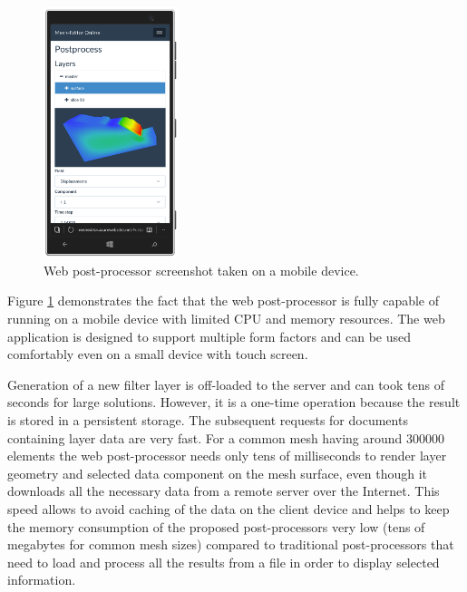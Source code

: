 \begin{figure}[H]
    \centering
    \includegraphics[width=0.35\textwidth]{figures/chapter-data-management/web-postprocessor-mobile}
    \decoRule
    \caption{Web post-processor screenshot taken on a mobile device.}
    \label{fig:web-postprocessor-mobile}
\end{figure}

Figure \ref{fig:web-postprocessor-mobile} demonstrates the fact that the web post-processor is fully capable of running on a mobile device with limited CPU and memory resources. The web application is designed to support multiple form factors and can be used comfortably even on a small device with touch screen.

Generation of a new filter layer is off-loaded to the server and can took tens of seconds for large solutions. However, it is a one-time operation because the result is stored in a persistent storage. The subsequent requests for documents containing layer data are very fast. For a common mesh having around 300000 elements the web post-processor needs only tens of milliseconds to render layer geometry and selected data component on the mesh surface, even though it downloads all the necessary data from a remote server over the Internet. This speed allows to avoid caching of the data on the client device and helps to keep the memory consumption of the proposed post-processors very low (tens of megabytes for common mesh sizes) compared to traditional post-processors that need to load and process all the results from a file in order to display selected information.

